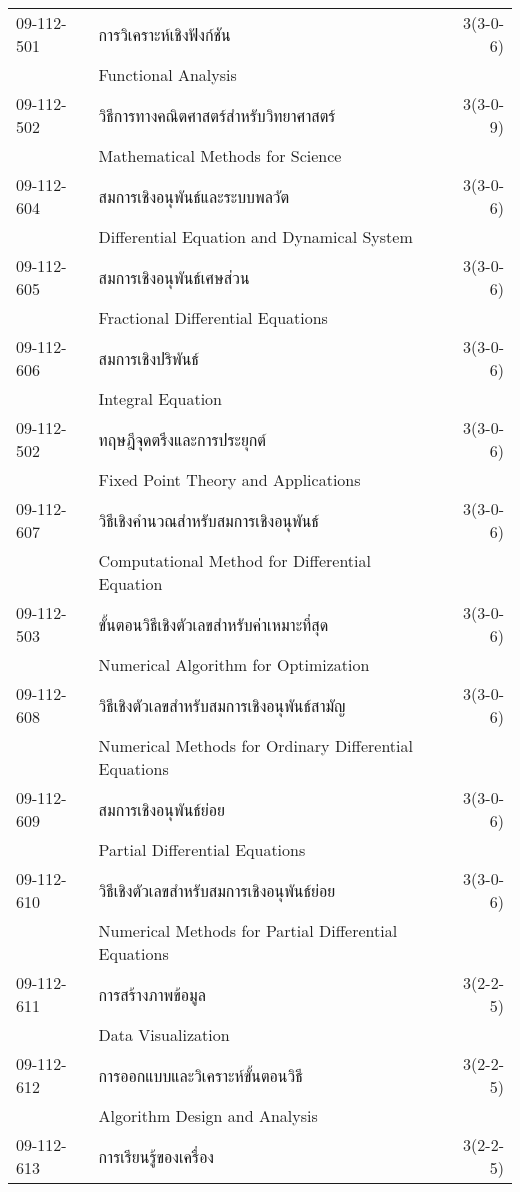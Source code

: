 \begin{longtable}{p{}p{}r{}}
09-112-501 & การวิเคราะห์เชิงฟังก์ชัน & 3(3-0-6)\\
 & Functional Analysis & \\[3mm]
09-112-502 & วิธีการทางคณิตศาสตร์สำหรับวิทยาศาสตร์ & 3(3-0-9)\\
 & Mathematical Methods for Science & \\[3mm]
09-112-604 & สมการเชิงอนุพันธ์และระบบพลวัต & 3(3-0-6)\\
 & Differential Equation and Dynamical System & \\[3mm]
09-112-605 & สมการเชิงอนุพันธ์เศษส่วน & 3(3-0-6)\\
 & Fractional Differential Equations & \\[3mm]
09-112-606 & สมการเชิงปริพันธ์ & 3(3-0-6)\\
 & Integral Equation & \\[3mm]
09-112-502 & ทฤษฎีจุดตรึงและการประยุกต์ & 3(3-0-6)\\
 & Fixed Point Theory and Applications & \\[3mm]
09-112-607 & วิธีเชิงคำนวณสำหรับสมการเชิงอนุพันธ์ & 3(3-0-6)\\
 & Computational Method for Differential Equation & \\[3mm]
09-112-503 & ขั้นตอนวิธีเชิงตัวเลขสำหรับค่าเหมาะที่สุด & 3(3-0-6)\\
 & Numerical Algorithm for Optimization & \\[3mm]
09-112-608 & วิธีเชิงตัวเลขสำหรับสมการเชิงอนุพันธ์สามัญ & 3(3-0-6)\\
 & Numerical Methods for Ordinary Differential Equations & \\[3mm]
09-112-609 & สมการเชิงอนุพันธ์ย่อย & 3(3-0-6)\\
 & Partial Differential Equations & \\[3mm]
09-112-610 & วิธีเชิงตัวเลขสำหรับสมการเชิงอนุพันธ์ย่อย & 3(3-0-6)\\
 & Numerical Methods for Partial Differential Equations & \\[3mm]
09-112-611 & การสร้างภาพข้อมูล & 3(2-2-5)\\
 & Data Visualization & \\[3mm]
09-112-612 & การออกแบบและวิเคราะห์ขั้นตอนวิธี & 3(2-2-5)\\
 & Algorithm Design and Analysis & \\[3mm]
09-112-613 & การเรียนรู้ของเครื่อง & 3(2-2-5)\\

\end{longtable}
